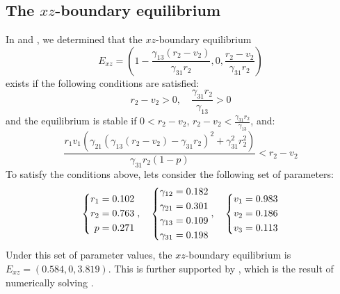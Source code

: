 \subsection{The $xz$-boundary equilibrium}\label{subsec:numsim_xz_boundary_equilibrium}
In  and , we determined that the $xz$-boundary equilibrium
\[
E_{xz}=\left(1-\frac{\gamma_{13}\left(r_2-v_2\right)}{\gamma_{31}r_2},0,\frac{r_2-v_2}{\gamma_{31}r_2}\right)
\]
exists if the following conditions are satisfied:
\[
r_2-v_2>0,\quad \frac{\gamma_{31}r_2}{\gamma_{13}}>0
\]
and the equilibrium is stable if $0<r_2-v_2$, $\displaystyle r_2-v_2<\frac{\gamma_{31}r_2}{\gamma_{13}}$, and:
\[
\frac{r_1v_1\left(\gamma_{21}\left(\gamma_{13}\left(r_2-v_2\right)-\gamma_{31}r_2\right)^2+\gamma_{31}^2r_2^2\right)}{\gamma_{31}r_2\left(1-p\right)}<r_2-v_2
\]
To satisfy the conditions above, lets consider the following set of parameters:
\begin{equation}
    \begin{dcases}
        \begin{aligned}
            r_1 &= 0.102\\
            r_2 &= 0.763\\
            p &= 0.271
        \end{aligned}
    \end{dcases},\quad 
    \begin{dcases}
        \begin{aligned}
            \gamma_{12} &= 0.182\\
            \gamma_{21} &= 0.301\\
            \gamma_{13} &= 0.109\\
            \gamma_{31} &= 0.198
        \end{aligned}
    \end{dcases},\quad
    \begin{dcases}
        \begin{aligned}
            v_1 &= 0.983\\
            v_2 &= 0.186\\
            v_3 &= 0.113
        \end{aligned}
    \end{dcases} 
    \label{params:6.3}
\end{equation}
Under this set of parameter values, the $xz$-boundary equilibrium is $E_{xz}=(0.584,0,3.819)$. This is further supported by , which is the result of numerically solving .

